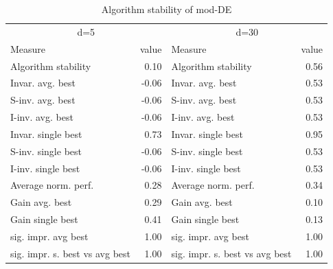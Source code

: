 \begin{table}
\caption{Algorithm stability of mod-DE}
\begin{tabular}{lrlr}
\toprule
\multicolumn{2}{c}{d=5} & \multicolumn{2}{c}{d=30} \\
Measure & value & Measure & value \\
\midrule
Algorithm stability & 0.10 & Algorithm stability & 0.56 \\
Invar. avg. best & -0.06 & Invar. avg. best & 0.53 \\
S-inv. avg. best & -0.06 & S-inv. avg. best & 0.53 \\
I-inv. avg. best & -0.06 & I-inv. avg. best & 0.53 \\
Invar. single best & 0.73 & Invar. single best & 0.95 \\
S-inv. single best & -0.06 & S-inv. single best & 0.53 \\
I-inv. single best & -0.06 & I-inv. single best & 0.53 \\
Average norm. perf. & 0.28 & Average norm. perf. & 0.34 \\
Gain avg. best & 0.29 & Gain avg. best & 0.10 \\
Gain single best & 0.41 & Gain single best & 0.13 \\
sig. impr. avg best & 1.00 & sig. impr. avg best & 1.00 \\
sig. impr. s. best vs avg best & 1.00 & sig. impr. s. best vs avg best & 1.00 \\
\bottomrule
\end{tabular}
\end{table}
